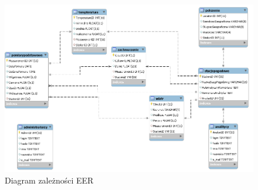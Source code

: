 \documentclass[12pt,a4paper]{article}
\begin{document}
\begin{figure}[!htb]
\includegraphics[width=\textwidth]{./figures/diagram_zwiazkow.png}
\caption{Diagram zależności EER}
\end{figure}
\end{document}
